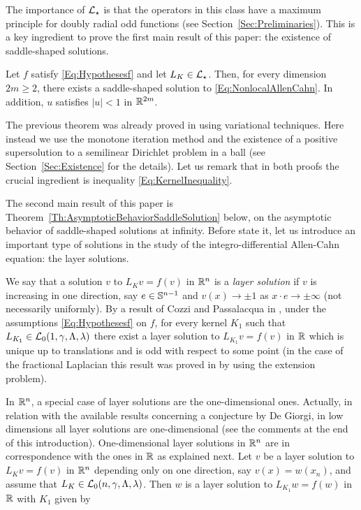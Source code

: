 The importance of $\mathcal{L}_\star$ is that the operators in this class have a maximum principle for doubly radial odd functions (see Section~\ref{Sec:Preliminaries}). This is a key ingredient to prove the first main result of this paper: the existence of saddle-shaped solutions.

\begin{theorem}
	\label{Th:Existence}
	Let $f$ satisfy \eqref{Eq:Hypothesesf} and let $L_K\in \mathcal{L}_\star$. Then, for every dimension $2m \geq 2$, there exists a saddle-shaped solution to \eqref{Eq:NonlocalAllenCahn}. In addition, $u$ satisfies $|u|<1$ in $\mathbb{R}^{2m}$.
\end{theorem}

The previous theorem was already proved in \cite{FelipeSanz-Perela:IntegroDifferentialI} using variational techniques. Here instead we use the monotone iteration method and the existence of a positive supersolution to a semilinear Dirichlet problem in a ball (see Section~\ref{Sec:Existence} for the details). Let us remark that in both proofs the crucial ingredient is inequality \eqref{Eq:KernelInequality}.


The second main result of this paper is Theorem~\ref{Th:AsymptoticBehaviorSaddleSolution} below, on the asymptotic behavior of saddle-shaped solutions at infinity. Before state it, let us introduce an important type of solutions in the study of the integro-differential Allen-Cahn equation: the layer solutions.


We say that a solution $v$ to $L_K v = f(v)$ in $\mathbb{R}^n$ is a \emph{layer solution} if $v$ is increasing in one direction, say $e\in \mathbb{S}^{n-1}$ and $v(x) \to \pm 1$ as $x\cdot e \to \pm \infty$ (not necessarily uniformly). By a result of Cozzi and Passalacqua in \cite{CozziPassalacqua}, under the assumptions \eqref{Eq:Hypothesesf} on $f$, for every kernel $K_1$ such that $L_{K_1}\in \mathcal{L}_0(1,\gamma,\Lambda, \lambda)$ there exist a layer solution  to $L_{K_1} v = f(v)$ in $\mathbb{R}$ which is unique up to translations and is odd with respect to some point (in the case of the fractional Laplacian this result was proved in \cite{CabreSolaMorales,CabreSireII} by using the extension problem).

In $\mathbb{R}^n$, a special case of layer solutions are the one-dimensional ones. Actually, in relation with the available results concerning a conjecture by De Giorgi, in low dimensions all layer solutions are one-dimensional (see the comments at the end of this introduction). One-dimensional layer solutions in $\mathbb{R}^n$ are in correspondence with the ones in $\mathbb{R}$ as explained next. Let $v$ be a layer solution to $L_K v = f(v)$ in $\mathbb{R}^n$ depending only on one direction, say $v(x) = w(x_n)$, and assume that $L_{K}\in \mathcal{L}_0(n,\gamma,\Lambda, \lambda)$. Then $w$ is a layer solution to $L_{K_1} w = f(w)$ in $\mathbb{R}$ with $K_1$ given by

